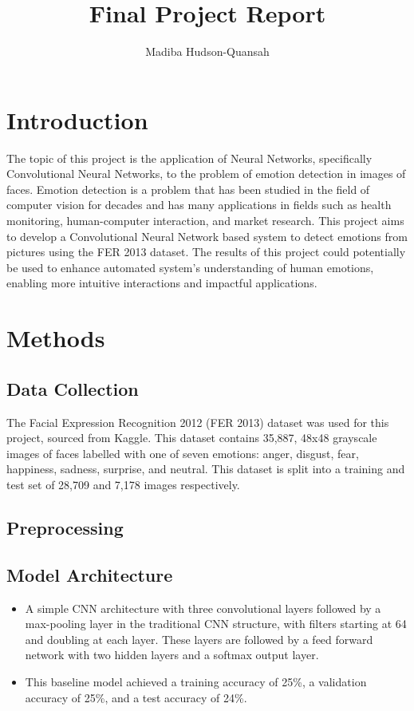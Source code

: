 \documentclass[12pt letter]{report}
\title{\Huge{Final Project Report}}
\author{\huge{Madiba Hudson-Quansah}}
\date{}
\begin{document}
\maketitle
\newpage

\section*{Introduction}

The topic of this project is the application of Neural Networks, specifically Convolutional Neural Networks, to the
problem of emotion detection in images of faces. Emotion detection is a problem that has been studied in the field of
computer vision for decades and has many applications in fields such as health monitoring, human-computer interaction,
and market research. This project aims to develop a Convolutional Neural Network based system to detect emotions from
pictures using the FER 2013 dataset. The results of this project could potentially be used to enhance automated system's
understanding of human emotions, enabling more intuitive interactions and impactful applications.


\section*{Methods}

\subsection*{Data Collection}

The Facial Expression Recognition 2012 (FER 2013) dataset was used for this project, sourced from Kaggle. This dataset
contains 35,887, 48x48 grayscale images of faces labelled with one of seven emotions: anger, disgust, fear, happiness, sadness, surprise, and neutral.
This dataset is split into a training and test set of 28,709 and 7,178 images respectively.

\subsection*{Preprocessing}

\subsection*{Model Architecture}

\begin{itemize}
  \item A simple CNN architecture with three convolutional layers followed by a max-pooling layer in the traditional
        CNN structure, with filters starting at 64 and doubling at each layer. These layers are followed by a feed
        forward network with two hidden layers and a softmax output layer.
  \item This baseline model achieved a training accuracy of 25\%, a validation accuracy of 25\%, and a test accuracy of
        24\%.
\end{itemize}
\end{document}
